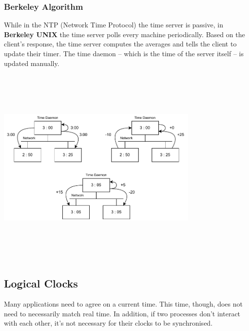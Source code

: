 \documentclass{article}
\begin{document}
\subsubsection{Berkeley Algorithm}
While in the NTP (Network Time Protocol) the time server is passive, in \textbf{Berkeley UNIX} the time server polls every machine periodically. Based on the client's response, the time server computes the averages and tells the client to update their timer. The time daemon -- which is the time of the server itself -- is updated manually.
\begin{center}
	\includegraphics[width=10cm, height=10cm, keepaspectratio]{assets/berkeley-time.pdf}
\end{center}

\subsection{Logical Clocks}
Many applications need to agree on a current time. This time, though, does not need to necessarily match real time. In addition, if two processes don't interact with each other, it's not necessary for their clocks to be synchronised.
\end{document}
